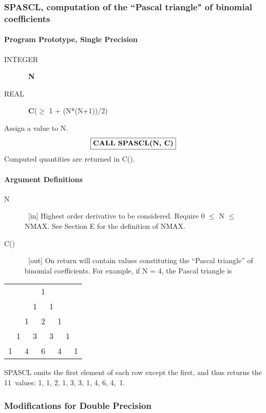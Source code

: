 \documentclass[twoside]{MATH77}
\begin{document}
\subsubsection{SPASCL, computation of the ``Pascal triangle" of binomial
coefficients\label{B5}}

\paragraph{Program Prototype, Single Precision}

\begin{description}
\item[INTEGER]  \ {\bf N}

\item[REAL]  \ {\bf C}($\geq $ 1 + (N*(N+1))/2)
\end{description}

Assign a value to N.
$$
\fbox{{\bf CALL SPASCL(N, C)}}
$$
Computed quantities are returned in C().

\paragraph{Argument Definitions}

\begin{description}
\item[N]  \ [in] Highest order derivative to be considered. Require 0 $\leq $
N $\leq $ NMAX. See Section E for the definition of NMAX.

\item[C()]  \ [out] On return will contain values constituting the ``Pascal
triangle'' of binomial coefficients. For example, if N = 4, the Pascal
triangle is
\end{description}

\begin{center}
\begin{tabular}{c}
1\\
1\ \ \ 1\\
1\ \ \ 2\ \ \ 1\\
1\ \ \ 3\ \ \ 3\ \ \ 1\\
1\ \ \ 4\ \ \ 6\ \ \ 4\ \ \ 1
\end{tabular}
\end{center}

SPASCL omits the first element of each row except the first, and thus
returns the 11~values: 1, 1, 2, 1, 3, 3, 1, 4, 6, 4,~1.

\subsubsection{Modifications for Double Precision\label{B6}}
\end{document}
